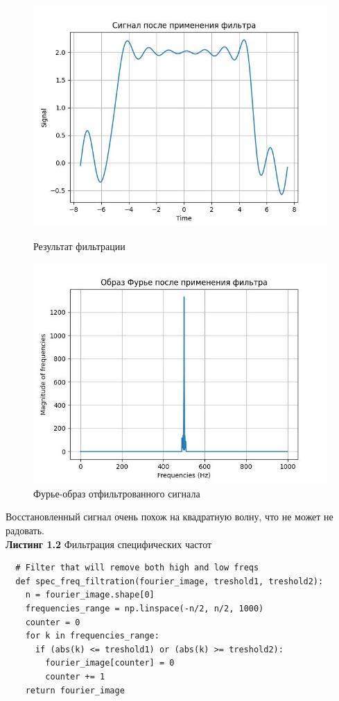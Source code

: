           \begin{figure}[!htb]
              \includegraphics[width=\linewidth]{../images/result/spec_freq2.jpeg}
              \caption{Результат фильтрации}
            \endminipage\hfill
              \includegraphics[width=\linewidth]{../images/result/spec_freq2_fourier.jpeg}
              \caption{Фурье-образ отфильтрованного сигнала}
            \endminipage\hfill
            \end{figure}
        \noindent Восстановленный сигнал очень похож на квадратную волну, что не может не радовать. 
        \\
        \noindent \textbf{Листинг 1.2} Фильтрация специфических частот
        \begin{lstlisting}
  # Filter that will remove both high and low freqs
  def spec_freq_filtration(fourier_image, treshold1, treshold2):
    n = fourier_image.shape[0]
    frequencies_range = np.linspace(-n/2, n/2, 1000)
    counter = 0 
    for k in frequencies_range:
      if (abs(k) <= treshold1) or (abs(k) >= treshold2):
        fourier_image[counter] = 0
        counter += 1
    return fourier_image
        \end{lstlisting}
        
